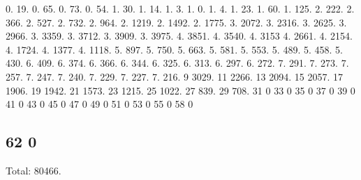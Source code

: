 0. 19. 0. 65. 0. 73. 0. 54. 1. 30. 1. 14. 1. 3. 1. 0. 1. 4. 1. 23. 1. 60. 1. 125. 2. 222. 2. 366. 2. 527. 2. 732. 2. 964. 2. 1219. 2. 1492. 2. 1775. 3. 2072. 3. 2316. 3. 2625. 3. 2966. 3. 3359. 3. 3712. 3. 3909. 3. 3975. 4. 3851. 4. 3540. 4. 3153 4. 2661. 4. 2154. 4. 1724. 4. 1377. 4. 1118. 5. 897. 5. 750. 5. 663. 5. 581. 5. 553. 5. 489. 5. 458. 5. 430. 6. 409. 6. 374. 6. 366. 6. 344. 6. 325. 6. 313. 6. 297. 6. 272. 7. 291. 7. 273. 7. 257. 7. 247. 7. 240. 7. 229. 7. 227. 7. 216. 9 3029. 11 2266. 13 2094. 15 2057. 17 1906. 19 1942. 21 1573. 23 1215. 25 1022. 27 839. 29 708. 31 0 33 0 35 0 37 0 39 0 41 0 43 0 45 0 47 0 49 0 51 0 53 0 55 0 58 0 \subsection*{62 0 }

Total\+: 80466. 